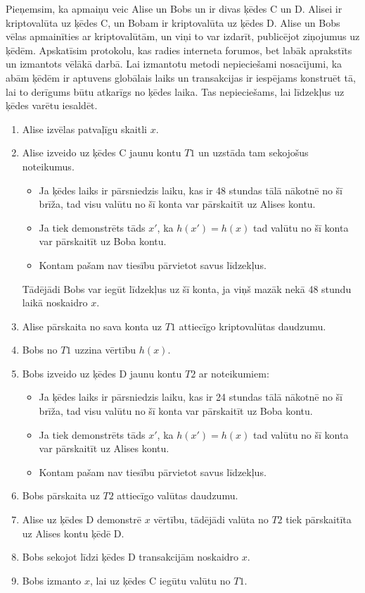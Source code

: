 Pieņemsim, ka apmaiņu veic Alise un Bobs un ir divas ķēdes C un D. Alisei ir kriptovalūta uz ķēdes C, un Bobam ir kriptovalūta uz ķēdes D. Alise un Bobs vēlas apmainīties ar kriptovalūtām, un viņi to var izdarīt, publicējot ziņojumus uz ķēdēm. Apskatīsim protokolu, kas radies interneta forumos\cite{nolan13}, bet labāk aprakstīts un izmantots vēlākā darbā\cite{back14}. Lai izmantotu metodi nepieciešami nosacījumi, ka abām ķēdēm ir aptuvens globālais laiks un transakcijas ir iespējams konstruēt tā, lai to derīgums būtu atkarīgs no ķēdes laika. Tas nepieciešams, lai līdzekļus uz ķēdes varētu iesaldēt.
\begin{enumerate}
    \item Alise izvēlas patvaļīgu skaitli $x$.
    \item Alise izveido uz ķēdes C jaunu kontu $T1$ un uzstāda tam sekojošus noteikumus.
        \begin{itemize}
            \item Ja ķēdes laiks ir pārsniedzis laiku, kas ir 48 stundas tālā nākotnē no šī brīža, tad visu valūtu no šī konta var pārskaitīt uz Alises kontu.
            \item Ja tiek demonstrēts tāds $x'$, ka $h(x') = h(x)$ tad valūtu no šī konta var pārskaitīt uz Boba kontu.
            \item Kontam pašam nav tiesību pārvietot savus līdzekļus.
        \end{itemize}
        Tādējādi Bobs var iegūt līdzekļus uz šī konta, ja viņš mazāk nekā 48 stundu laikā noskaidro $x$.
    \item Alise pārskaita no sava konta uz $T1$ attiecīgo kriptovalūtas daudzumu.
    \item Bobs no $T1$ uzzina vērtību $h(x)$.
    \item Bobs izveido uz ķēdes D jaunu kontu $T2$ ar noteikumiem:
        \begin{itemize}
            \item Ja ķēdes laiks ir pārsniedzis laiku, kas ir 24 stundas tālā nākotnē no šī brīža, tad visu valūtu no šī konta var pārskaitīt uz Boba kontu.
            \item Ja tiek demonstrēts tāds $x'$, ka $h(x') = h(x)$ tad valūtu no šī konta var pārskaitīt uz Alises kontu.
            \item Kontam pašam nav tiesību pārvietot savus līdzekļus.
        \end{itemize}
    \item Bobs pārskaita uz $T2$ attiecīgo valūtas daudzumu.
    \item Alise uz ķēdes D demonstrē $x$ vērtību, tādējādi valūta no $T2$ tiek pārskaitīta uz Alises kontu ķēdē D.
    \item Bobs sekojot līdzi ķēdes D transakcijām noskaidro $x$.
    \item Bobs izmanto $x$, lai uz ķēdes C iegūtu valūtu no $T1$.
\end{enumerate}
